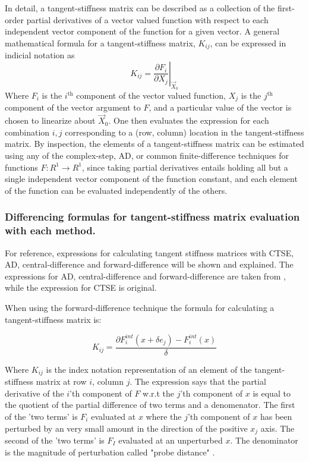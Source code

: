 \documentclass[preprint,12pt]{elsarticle}
\begin{document}
In detail, a tangent-stiffness matrix can be described as a collection of the first-order partial derivatives of a vector valued function with respect to each independent vector component of the function for a given vector.   A general mathematical formula for a tangent-stiffness matrix, $K_{ij}$,
can be expressed in indicial notation as 
%
\begin{equation} 
  K_{ij} = \left. \frac{\partial F_i}{\partial X_j}\right|_{\vec{X}_0}
\end{equation}
%
Where $F_i$ is the $i^{\mbox{th}}$ component of the vector valued function, $X_j$ is the $j^{\mbox{th}}$ component of the vector argument to $F$, and a particular value of the vector is chosen to linearize about $\vec{X}_0$. One then evaluates the expression for each combination $i, j$ corresponding to a (row, column) location in the tangent-stiffness matrix. By inspection, the elements of a tangent-stiffness matrix can be estimated using any of the complex-step, AD, or common finite-difference techniques for functions $F:R^1 \rightarrow R^1$, since taking partial derivatives entails holding all but a single independent vector component of the function constant, and each element of the function can be evaluated independently of the others. \\ 

\subsubsection{Differencing formulas for tangent-stiffness matrix evaluation with each method.}
For reference, expressions for calculating tangent stiffness matrices with CTSE, AD,
central-difference and forward-difference will be shown and explained. The expressions for AD,
central-difference and forward-difference are taken from \cite{ref-Adaggio}, while the expression
for CTSE is original. 

When using the forward-difference technique the formula for calculating a tangent-stiffness
matrix is:

\begin{equation} K_{ij} = \frac{\partial F_i^{int}(x + \delta e_j) - F_i^{int}(x)}{\delta}
\end{equation}

Where $K_{ij}$ is the index notation representation of an element of the tangent-stiffness matrix at
row $i$, column $j$. The expression says that the partial derivative of the $i$'th component of $F$
w.r.t the $j$'th component of $x$ is equal to the quotient of the partial difference of two terms
and a denomenator. The first of the 'two terms' is $F_i$ evaluated at $x$ where
the $j$'th component of $x$ has been perturbed by an very small amount in the direction of the
positive $x_j$ axis. The second of the 'two terms' is $F_I$ evaluated at an unperturbed $x$. The
denominator is the magnitude of perturbation called "probe distance" \cite{ref-Adaggio}.
\end{document}
